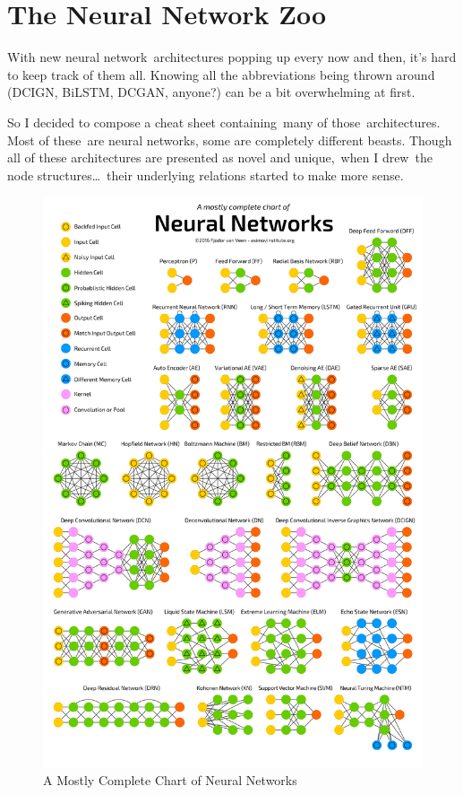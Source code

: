 \documentclass[11pt,a4paper,oneside]{ctexbook}
\begin{document}
	\tableofcontents
	

\chapter{The Neural Network Zoo}

With new neural network architectures popping up every now and then, it’s hard to keep track of them all. Knowing all the abbreviations being thrown around (DCIGN, BiLSTM, DCGAN, anyone?) can be a bit overwhelming at first.

So I decided to compose a cheat sheet containing many of those architectures. Most of these are neural networks, some are completely different beasts. Though all of these architectures are presented as novel and unique, when I drew the node structures… their underlying relations started to make more sense.

\begin{figure}
	\centering
	\includegraphics[width=\linewidth]{figures/neuralnetworks}
	\caption{A Mostly Complete Chart of Neural Networks}
	\label{fig:neuralnetworks}
\end{figure}
\end{document}
